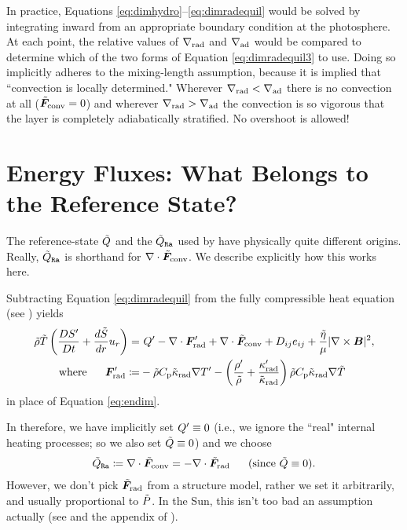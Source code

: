 \documentclass[12pt]{article}
\numberwithin{equation}{section}
\begin{document}
In practice, Equations \eqref{eq:dimhydro}--\eqref{eq:dimradequil} would be solved by integrating inward from an appropriate boundary condition at the photosphere. At each point, the relative values of $\nabla_{\rm rad}$ and $\nabla_{\rm ad}$ would be compared to determine which of the two forms of Equation \eqref{eq:dimradequil3} to use. Doing so implicitly adheres to the mixing-length assumption, because it is implied that ``convection is locally determined." Wherever $\nabla_{\rm rad} <\nabla_{\rm ad}$ there is no convection at all ($\tilde{\bm{F}}_{\rm conv}=0$) and wherever $\nabla_{\rm rad} >\nabla_{\rm ad}$ the convection is so vigorous that the layer is completely adiabatically stratified. No overshoot is allowed! 

\section{Energy Fluxes: What Belongs to the Reference State?}\label{sec:flux}
The reference-state $\tilde{Q}$ and the $\tilde{Q}_{\texttt{Ra}}$ used by {\rayleigh} have physically quite different origins. Really, $\tilde{Q}_{\texttt{Ra}}$ is shorthand for $\nabla\cdot\tilde{\bm{F}}_{\rm conv}$. We describe explicitly how this works here. 

Subtracting Equation \eqref{eq:dimradequil} from the fully compressible heat equation (see \citealt{Matilsky2024b}) yields
\begin{subequations}\label{eq:endim2}
\begin{align}
	\tilde{\rho}\tilde{T} \left(\frac{D{S^\prime}}{Dt} + \frac{d\tilde{S}}{dr} u_r\right) = &\ {Q^\prime} -\nabla\cdot\bm{F}^\prime_{\rm rad}  +\nabla\cdot\tilde{\bm{F}}_{\rm conv}+ D_{ij}e_{ij} + \frac{\tilde{\eta}}{\mu}|\nabla\times\bm{B}|^2,\\
	\text{where}\ \ \ \ \  \bm{F}^\prime_{\rm rad} \coloneqq & -\tilde{\rho} C_{\rm{p}} \tilde{\kappa}_{\rm rad} \nabla{T^\prime} -\left(\frac{{\rho^\prime}}{\tilde{\rho}} + \frac{\kappa^\prime_{\rm rad}}{\tilde{\kappa}_{\rm rad}}\right)\tilde{\rho}C_{\rm{p}}\tilde{\kappa}_{\rm rad}\nabla\tilde{T}
\end{align}
\end{subequations}
in place of Equation \eqref{eq:endim}. 

In {\rayleigh} therefore, we have implicitly set ${Q^\prime}\equiv0$ (i.e., we ignore the ``real" internal heating processes; so we also set $\tilde{Q}\equiv0$) and we choose 
\begin{align}
	\heatra\define \Div\fconvtilde=-\Div\fradtilde\five\text{(since}\ \heattilde\equiv0\text{)}.
\end{align}
However, we don't pick $\tilde{\bm{F}}_{\rm rad}$ from a structure model, rather we set it arbitrarily, and usually proportional to $\tilde{P}$. In the Sun, this isn't too bad an assumption actually (see \citealt{Featherstone2016a} and the appendix of \citealt{Matilsky2024}).
\end{document}
